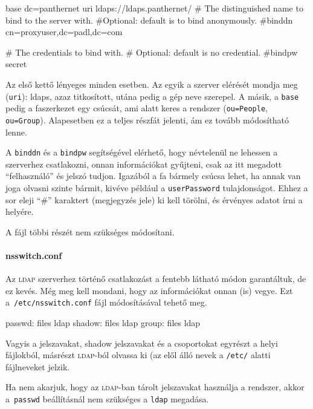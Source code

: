 \begin{VerbExample}[frame=topline,label=/etc/ldap.conf részlet]
base dc=panthernet
uri ldaps://ldaps.panthernet/
# The distinguished name to bind to the server with.
#Optional: default is to bind anonymously.
#binddn cn=proxyuser,dc=padl,dc=com
  
# The credentials to bind with.
# Optional: default is no credential.
#bindpw secret
\end{VerbExample}

Az első kettő lényeges minden esetben. Az egyik a szerver elérését mondja meg (\texttt{uri}): ldaps, azaz titkosított,
utána pedig a gép neve szerepel. A másik, a \texttt{base} pedig a faszerkezet egy csúcsát, ami alatt keres a rendszer
(\texttt{ou=People}, \texttt{ou=Group}). Alapesetben ez a teljes részfát jelenti, ám ez tovább módosítható lenne.

A \texttt{binddn} és a \texttt{bindpw} segítségével elérhető, hogy névtelenül ne lehessen a szerverhez csatlakozni,
onnan információkat gyűjteni, csak az itt megadott ``felhasználó'' és jelszó tudjon. Igazából a fa bármely csúcsa
lehet, ha annak van joga olvasni szinte bármit, kivéve például a \texttt{userPassword} tulajdonságot. Ehhez a sor
eleji ``\#'' karaktert (megjegyzés jele) ki kell törölni, és érvényes adatot írni a helyére.

A fájl többi részét nem szükséges módosítani.

\paragraph{nsswitch.conf} Az \textsc{ldap} szerverhez történő csatlakozást a fentebb látható módon garantáltuk, de ez
kevés. Még meg kell mondani, hogy az információkat onnan (is) vegye. Ezt a~\texttt{/etc/nsswitch.conf} fájl
módosításával tehető meg.

\begin{VerbExample}[frame=topline,label=/etc/nsswitch.conf \textsc{ldap}-ot használó része]
passwd:      files ldap
shadow:      files ldap
group:       files ldap
\end{VerbExample}

Vagyis a jelszavakat, shadow jelszavakat és a csoportokat egyrészt a helyi fájlokból, másrészt \textsc{ldap}-ból olvassa ki (az
elől álló nevek a \texttt{/etc/} alatti fájlneveket jelzik.

Ha nem akarjuk, hogy az \textsc{ldap}-ban tárolt jelszavakat használja a rendszer, akkor a~\texttt{passwd} beállításnál nem
szükséges a \texttt{ldap} megadása.


